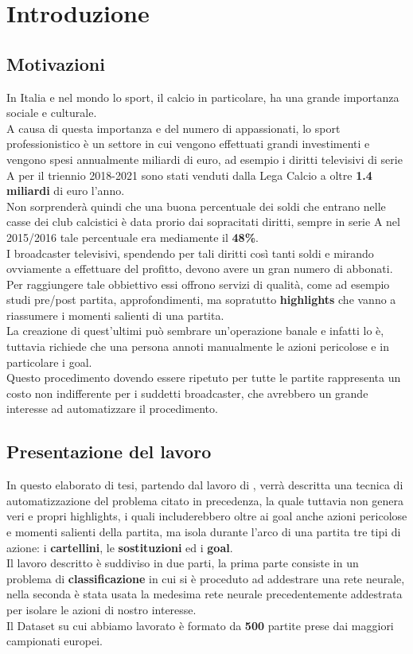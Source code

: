 \chapter{Introduzione}\label{ch:introduzione}
\section*{Motivazioni}
In Italia e nel mondo lo sport, il calcio in particolare, ha una grande importanza sociale e culturale.
\\A causa di questa importanza e del numero di appassionati, lo sport professionistico è un settore in cui vengono effettuati grandi investimenti e vengono spesi annualmente miliardi di euro, ad esempio i diritti televisivi di serie A per il triennio 2018-2021 sono stati venduti dalla Lega Calcio a oltre \textbf{1.4 miliardi} di euro l'anno. \cite{DirittiTriennio2018-21}
\\Non sorprenderà quindi che una buona percentuale dei soldi che entrano nelle casse dei club calcistici è data prorio dai sopracitati diritti, sempre in serie A nel 2015/2016 tale percentuale era mediamente il \textbf{48\%}. \cite{impattoDirittiTv}
\\I broadcaster televisivi, spendendo per tali diritti così tanti soldi e mirando ovviamente a effettuare del profitto, devono avere un gran numero di abbonati. Per raggiungere tale obbiettivo essi offrono servizi di qualità, come ad esempio studi pre/post partita, approfondimenti, ma sopratutto \textbf{highlights} che vanno a riassumere i momenti salienti di una partita. 
\\La creazione di quest'ultimi può sembrare un'operazione banale e infatti lo è, tuttavia richiede che una persona annoti manualmente le azioni pericolose e in particolare i goal.
\\Questo procedimento dovendo essere ripetuto per tutte le partite rappresenta un costo non indifferente per i suddetti broadcaster, che avrebbero un grande interesse ad automatizzare il procedimento.
\section*{Presentazione del lavoro}
In questo elaborato di tesi, partendo dal lavoro di \citet{soccerNet} , verrà descritta una tecnica di automatizzazione del problema citato in precedenza, la quale tuttavia non genera veri e propri highlights, i quali includerebbero oltre ai goal anche azioni pericolose e momenti salienti della partita, ma isola durante l'arco di una partita tre tipi di azione: i \textbf{cartellini}, le \textbf{sostituzioni} ed i \textbf{goal}.
\\Il lavoro descritto è suddiviso in due parti, la prima parte consiste in un problema di \textbf{classificazione} in cui si è proceduto ad addestrare una rete neurale, nella seconda è stata usata la medesima rete neurale precedentemente addestrata per isolare le azioni di nostro interesse.
\\Il Dataset su cui abbiamo lavorato è formato da \textbf{500} partite prese dai maggiori campionati europei.


